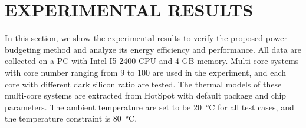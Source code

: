 \section{EXPERIMENTAL RESULTS}
In this section, we show the experimental results to verify the proposed power budgeting method and analyze its energy efficiency and performance. All data are collected on a PC with Intel I5 2400 CPU and 4 GB memory. Multi-core systems with core number ranging from $9$ to $100$ are used in the experiment, and each core with different dark silicon ratio are tested. The thermal models of these multi-core systems are extracted from HotSpot with default package and chip parameters. The ambient temperature are set to be \SI{20}{\degreeCelsius} for all test cases, and the temperature constraint is \SI{80}{\degreeCelsius}.


\begin{figure}
  \centering
  \hfill
\end{figure}
